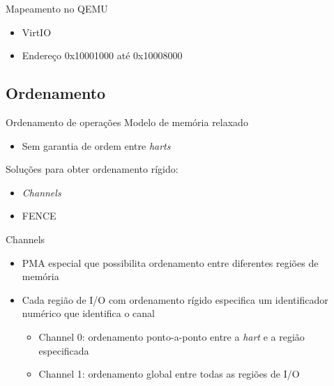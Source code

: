 \documentclass[brazil,nolapesd,aspectratio=169,noartschool]{lapesd-slides}
\begin{document}
	\begin{frame}{Mapeamento no QEMU}
		\begin{itemize}
			\item VirtIO
			\item Endereço 0x10001000 até 0x10008000
		\end{itemize}
	\end{frame}


	\subsection{Ordenamento}

	\begin{frame}{Ordenamento de operações}
		Modelo de memória relaxado
		\begin{itemize}
			\item Sem garantia de ordem entre \textit{harts}
		\end{itemize}

		\vspace{1em}

		Soluções para obter ordenamento rígido:
		\begin{itemize}
			\item \textit{Channels}
			\item FENCE
		\end{itemize}
	\end{frame}

	\begin{frame}{Channels}
		\begin{itemize}
			\item PMA especial que possibilita ordenamento entre diferentes regiões de memória
			\item Cada região de I/O com ordenamento rígido especifica um identificador numérico
				que identifica o canal
			\begin{itemize}
				\item Channel 0: ordenamento ponto-a-ponto entre a \textit{hart} e a região especificada
				\item Channel 1: ordenamento global entre todas as regiões de I/O
			\end{itemize}
		\end{itemize}
	\end{frame}
\end{document}
